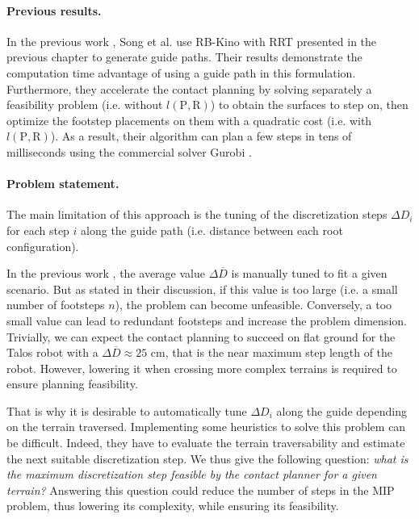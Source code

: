
\paragraph{Previous results.}
In the previous work \cite{sl1m_v2}, Song et al. use RB-Kino with RRT \cite{kinodynamic_sm_2017} presented in the previous chapter to generate guide paths.
Their results demonstrate the computation time advantage of using a guide path in this formulation. 
Furthermore, they accelerate the contact planning by solving separately a feasibility problem (i.e. without $l(\mbox{P},\mbox{R})$) to obtain the surfaces to step on, then optimize the footstep placements on them with a quadratic cost (i.e. with $l(\mbox{P},\mbox{R})$).
As a result, their algorithm can plan a few steps in tens of milliseconds using the commercial solver Gurobi \cite{gurobi}.

\paragraph{Problem statement.}
The main limitation of this approach is the tuning of the discretization steps $\Delta D_i$ for each step $i$ along the guide path (i.e. distance between each root configuration).

In the previous work \cite{sl1m_v2}, the average value $\Delta\overline{D}$ is manually tuned to fit a given scenario.
But as stated in their discussion, if this value is too large (i.e. a small number of footsteps $n$), the problem can become unfeasible. Conversely, a too small value can lead to redundant footsteps and increase the problem dimension.
Trivially, we can expect the contact planning to succeed on flat ground for the Talos robot with a $\Delta\overline{D} \approx 25$ cm, that is the near maximum step length of the robot. However, lowering it when crossing more complex terrains is required to ensure planning feasibility.

That is why it is desirable to automatically tune $\Delta D_i$ along the guide depending on the terrain traversed.
Implementing some heuristics to solve this problem can be difficult. Indeed, they have to evaluate the terrain traversability and estimate the next suitable discretization step.
We thus give the following question: \textit{what is the maximum discretization step feasible by the contact planner for a given terrain?}
Answering this question could reduce the number of steps in the MIP problem, thus lowering its complexity, while ensuring its feasibility.

